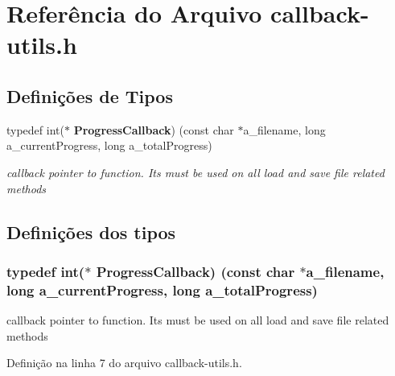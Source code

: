 \section{Referência do Arquivo callback-\/utils.h}
\label{callback-utils_8h}
\subsection*{Definições de Tipos}
\begin{DoxyCompactItemize}
\item 
typedef int($\ast$ {\bf Progress\+Callback}) (const char $\ast$a\+\_\+filename, long a\+\_\+current\+Progress, long a\+\_\+total\+Progress)
\begin{DoxyCompactList}\small\item\em callback pointer to function. It\textquotesingle{}s must be used on all load and save file related methods \end{DoxyCompactList}\end{DoxyCompactItemize}


\subsection{Definições dos tipos}
\subsubsection[{Progress\+Callback}]{\setlength{\rightskip}{0pt plus 5cm}typedef int($\ast$ Progress\+Callback) (const char $\ast$a\+\_\+filename, long a\+\_\+current\+Progress, long a\+\_\+total\+Progress)}\label{callback-utils_8h_a32ef87a4e72b19e3b5e045851a51da54}


callback pointer to function. It\textquotesingle{}s must be used on all load and save file related methods 



Definição na linha 7 do arquivo callback-\/utils.\+h.

